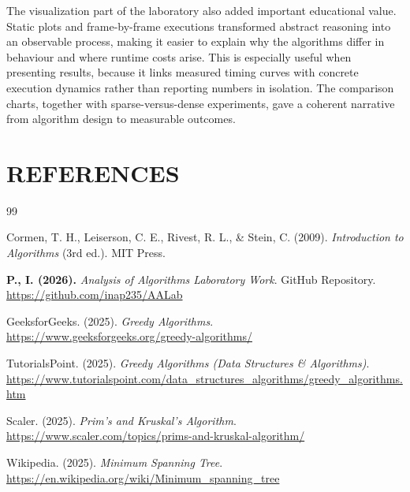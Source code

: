 ﻿\documentclass[12pt]{article}
\begin{document}
The visualization part of the laboratory also added important educational value. Static plots and frame-by-frame executions transformed abstract reasoning into an observable process, making it easier to explain why the algorithms differ in behaviour and where runtime costs arise. This is especially useful when presenting results, because it links measured timing curves with concrete execution dynamics rather than reporting numbers in isolation. The comparison charts, together with sparse-versus-dense experiments, gave a coherent narrative from algorithm design to measurable outcomes.


\newpage
{}
\section*{REFERENCES}
\vspace{-2.5em}
\renewcommand{\refname}{}
\begin{thebibliography}{99}

Cormen, T. H., Leiserson, C. E., Rivest, R. L., \& Stein, C. (2009).
\textit{Introduction to Algorithms} (3rd ed.). MIT Press.

\textbf{P., I. (2026).} \textit{Analysis of Algorithms Laboratory Work}. GitHub Repository.
\url{https://github.com/inap235/AALab}

GeeksforGeeks. (2025). \textit{Greedy Algorithms}.
\url{https://www.geeksforgeeks.org/greedy-algorithms/}

TutorialsPoint. (2025). \textit{Greedy Algorithms (Data Structures \& Algorithms)}.
\url{https://www.tutorialspoint.com/data_structures_algorithms/greedy_algorithms.htm}

Scaler. (2025). \textit{Prim's and Kruskal's Algorithm}.
\url{https://www.scaler.com/topics/prims-and-kruskal-algorithm/}

Wikipedia. (2025). \textit{Minimum Spanning Tree}.
\url{https://en.wikipedia.org/wiki/Minimum_spanning_tree}

\end{thebibliography}
\pagebreak
\end{document}
